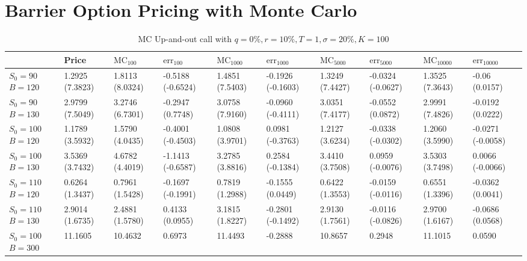 \chapter{Barrier Option Pricing with Monte Carlo}
\begin{center}
	\begin{table}[H]
		\begin{tabular}{ | m{4em} | m{1.4cm}| m{1.4cm} | m{1.4cm}| m{1.4cm} | m{1.37cm} | m{1.4cm} | m{1.4cm} | m{1.4cm} | m{1.45cm} |} 
			\hline
			& Price & $\text{MC}_{100}$ & $\text{err}_{100}$ & $\text{MC}_{1000}$ & $\text{err}_{1000}$ & $\text{MC}_{5000}$ & $\text{err}_{5000}$ & $\text{MC}_{10000}$ & $\text{err}_{10000}$  \\ 
			\hline
			$S_0=90$ $B=120$ & 1.2925 (7.3823) & 1.8113 (8.0324)  & -0.5188 (-0.6524) & 1.4851 (7.5403) & -0.1926 (-0.1603) & 1.3249 (7.4427) & -0.0324 (-0.0627) & 1.3525 (7.3643) & -0.06 (0.0157) \\ 
			\hline
			$S_0=90$ $B=130$ & 2.9799 (7.5049) & 3.2746 (6.7301) & -0.2947 (0.7748) & 3.0758 (7.9160) & -0.0960 (-0.4111) &  3.0351 (7.4177) & -0.0552 (0.0872) & 2.9991 (7.4826) & -0.0192 (0.0222) \\ 
			\hline
			$S_0=100$ $B=120$ & 1.1789 (3.5932) & 1.5790 (4.0435) & -0.4001 (-0.4503) & 1.0808 (3.9701)  & 0.0981 (-0.3763) & 1.2127 (3.6234) & -0.0338 (-0.0302) & 1.2060 (3.5990) & -0.0271 (-0.0058) \\ 
			\hline
			$S_0=100$ $B=130$ & 3.5369 (3.7432) & 4.6782 (4.4019)  & -1.1413 (-0.6587) & 3.2785 (3.8816) & 0.2584 (-0.1384) & 3.4410 (3.7508) & 0.0959 (-0.0076) & 3.5303 (3.7498)  & 0.0066 (-0.0066)\\ 
			\hline 
			$S_0=110$ $B=120$ & 0.6264 (1.3437) & 0.7961 (1.5428) & -0.1697 (-0.1991) & 0.7819 (1.2988) & -0.1555 (0.0449) & 0.6422 (1.3553) & -0.0159 (-0.0116) & 0.6551 (1.3396) & -0.0362 (0.0041) \\
			\hline
			$S_0=110$ $B=130$ & 2.9014 (1.6735) & 2.4881 (1.5780)  & 0.4133 (0.0955) & 3.1815 (1.8227) & -0.2801 (-0.1492) & 2.9130 (1.7561) & -0.0116 (-0.0826) & 2.9700 (1.6167) & -0.0686 (0.0568)\\
			\hline
			$S_0=100$ $B=300$ & 11.1605 & 10.4632 & 0.6973 & 11.4493 & -0.2888 & 10.8657 & 0.2948 & 11.1015 & 0.0590 \\
		\hline
		\end{tabular}
		\caption{MC Up-and-out call with $q=0\%,r=10\%, T=1,\sigma=20\%,K=100$}
		\label{tab:MC_barrer}
	\end{table}
\end{center}
